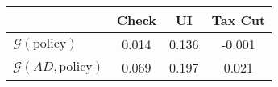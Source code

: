 \begin{tabular}{@{}lccc@{}} 
\toprule 
                          & Check      & UI    & Tax Cut    \\  \midrule 
$\mathcal{G}(\text{policy})$ & 0.014  & 0.136  & -0.001     \\ 
$\mathcal{G}(AD,\text{policy})$ & 0.069  & 0.197  & 0.021     \\ 
\end{tabular}  
